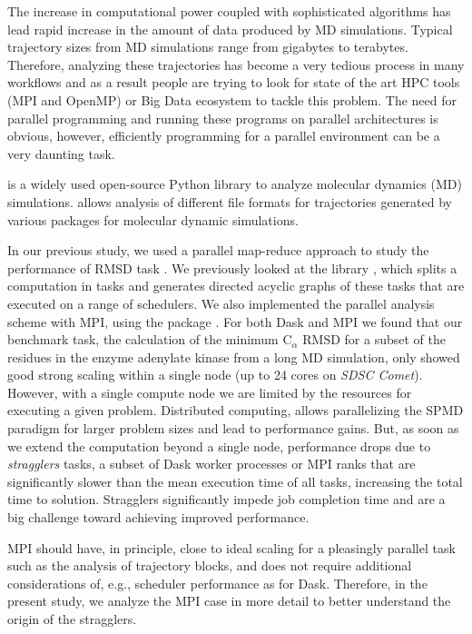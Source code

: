 \label{sec:introduction}
The increase in computational power coupled with sophisticated algorithms has lead rapid increase in the amount of data produced by MD simulations. 
Typical trajectory sizes from MD simulations range from gigabytes to terabytes. 
Therefore, analyzing these trajectories has become a very tedious process in many workflows and as a result people are trying to look for state of the art HPC tools (MPI and OpenMP) or Big Data ecosystem to tackle this problem.
The need for parallel programming and running these programs on parallel architectures is obvious, however, efficiently programming for a parallel environment can be a very daunting task. 

 \citep{Gowers:2016aa,Michaud-Agrawal:2011fu} is a widely used open-source Python library to analyze molecular dynamics (MD) simulations. 
 allows analysis of different file formats for trajectories generated by various packages for molecular dynamic simulations. 

In our previous study, we used a parallel map-reduce approach to study the performance of RMSD task \citep{Khoshlessan:2017ab}. 
We previously looked at the  library \citep{Rocklin:2015aa}, which splits a computation in tasks and generates directed acyclic graphs of these tasks that are executed on a range of schedulers. 
We also implemented the parallel analysis scheme with MPI, using the  package \citep{Dalcin:2011aa, Dalcin:2005aa}. 
For both Dask and MPI we found that our benchmark task, the calculation of the minimum C$_{\alpha}$ RMSD for a
subset of the residues in the enzyme adenylate kinase from a long MD simulation, only showed good strong scaling within a single node (up
to 24 cores on \emph{SDSC Comet}).
However, with a single compute node we are limited by the resources for executing a given problem.
Distributed computing, allows parallelizing the SPMD paradigm for larger problem sizes and lead to performance gains.
But, as soon as we extend the computation beyond a single node, performance drops due to \emph{stragglers} tasks, a subset of Dask worker processes or MPI ranks that are significantly slower than the mean execution time of all tasks, increasing the total time to solution.
Stragglers significantly impede job completion time and are a big challenge toward achieving improved performance.

MPI should have, in principle, close to ideal scaling for a pleasingly parallel task such as the analysis of trajectory blocks, and does not require additional considerations of, e.g., scheduler performance as for Dask. 
Therefore, in the present study, we analyze the MPI case in more detail to better understand the origin of the stragglers.

